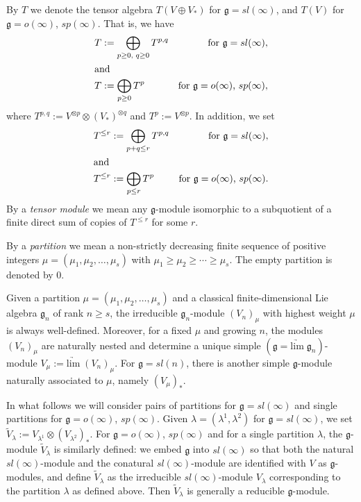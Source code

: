 \documentclass{amsart}
\renewcommand{\sl}{sl}
\newcommand{\so}{o}
\renewcommand{\sp}{sp}
\renewcommand{\gg}{\mathfrak{g}}
\newcommand{\limarr}{\underrightarrow{\mathrm{lim}} \;}
\theoremstyle{definition}
\numberwithin{equation}{section}
\begin{document}
By $T$ we denote the tensor algebra $T( V \oplus V_*)$ for $\gg = \sl(\infty)$, and $T(V)$ for $\gg = \so(\infty)$, $\sp(\infty)$.  That is, we have 
\begin{align*}
T & := \bigoplus_{p \geq 0 \textrm{, } q \geq 0} T^{p,q} &\textrm{for } \gg = \sl(\infty),\\
\intertext{and}
T & := \bigoplus_{p \geq 0} T^p & \textrm{for } \gg = \so(\infty) \textrm{, }\sp(\infty), 
\end{align*}
where $T^{p,q} := V^{\otimes p} \otimes (V_*)^{\otimes q}$ and $T^p := V^{\otimes p}$.  In addition, we set
\begin{align*}
T^{\leq r} & := \bigoplus_{p + q \leq r} T^{p,q} &\textrm{for } \gg = \sl(\infty),\\
\intertext{and}
T^{\leq r} & := \bigoplus_{p \leq r} T^p & \textrm{for } \gg = \so(\infty) \textrm{, }\sp(\infty).
\end{align*}
By a \emph{tensor module} we mean any $\gg$-module isomorphic to a subquotient of a finite direct sum of copies of $T^{\leq r}$ for some $r$.

By a \emph{partition} we mean a non-strictly decreasing finite sequence of positive integers $\mu = ( \mu_1, \mu_2, \ldots , \mu_s )$ with $\mu_1 \geq \mu_2 \geq \cdots \geq \mu_s$.  The empty partition is denoted by $0$.

Given a partition $\mu= ( \mu_1, \mu_2, \ldots , \mu_s )$ and a classical finite-dimensional Lie algebra $\gg_n$ of rank $n \geq s$, the irreducible $\gg_n$-module $(V_n)_\mu$ with highest weight $\mu$ is always well-defined.  Moreover, for a fixed $\mu$ and growing $n$, the modules $(V_n)_\mu$ are naturally nested and determine a unique simple $(\gg = \limarr \gg_n)$-module $V_\mu := \limarr (V_n)_\mu$.  For $\gg = \sl(n)$, there is another simple $\gg$-module naturally associated to $\mu$, namely $(V_\mu)_*$.

In what follows we will consider pairs of partitions for $\gg = \sl(\infty)$ and single partitions for $\gg = \so(\infty)$, $\sp(\infty)$.  Given $\lambda = (\lambda^1, \lambda^2)$ for $\gg = \sl(\infty)$, we set $\tilde V_\lambda := V_{\lambda^1} \otimes (V_{\lambda^2})_*$.  For $\gg = \so(\infty)$, $\sp(\infty)$ and for a single partition $\lambda$, the $\gg$-module $\tilde V_\lambda$ is similarly defined: we embed $\gg$ into $\sl(\infty)$ so that both the natural $\sl(\infty)$-module  
and the conatural $\sl(\infty)$-module 
are identified with $V$ as $\gg$-modules, and define $\tilde V_\lambda$ as the irreducible $\sl(\infty)$-module $V_\lambda$ corresponding to the partition $\lambda$ as defined above.  Then $\tilde{V}_\lambda$ is generally a reducible $\gg$-module.
\end{document}
